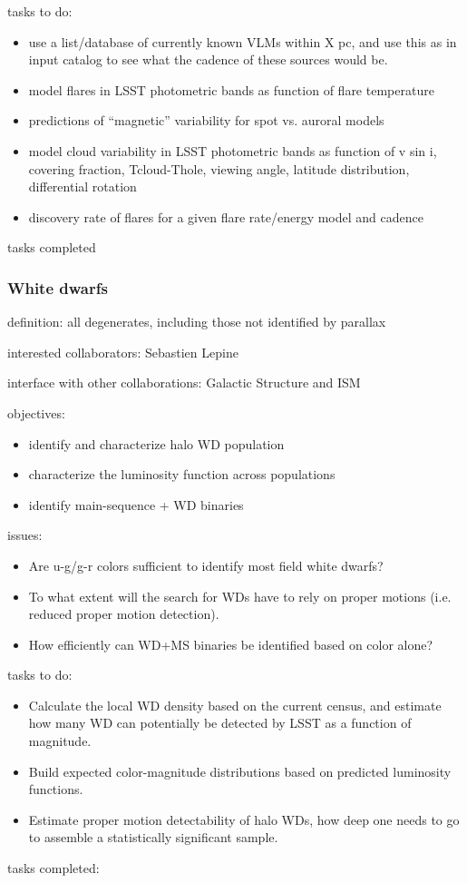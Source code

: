 tasks to do: 
\begin{itemize}
\item{ use 
a list/database of currently known VLMs within X pc, and use this as in input catalog 
to see what the cadence of these sources would be. }
\item{model 
flares in LSST photometric bands as function of flare temperature }
\item{predictions 
of “magnetic” variability for spot vs. auroral models }
\item{model 
cloud variability in LSST photometric bands as function of v sin i, covering 
fraction, Tcloud-Thole, viewing angle, latitude distribution, differential rotation }
\item{discovery 
rate of flares for a given flare rate/energy model and cadence }
\end{itemize}

tasks completed 


\subsubsection{White dwarfs}

definition: all degenerates, including those not identified by parallax  

interested collaborators: 
Sebastien Lepine 

interface with other collaborations: 
Galactic 
Structure and ISM  

objectives: 
\begin{itemize}
\item{identify and characterize halo WD population }
\item{characterize 
the luminosity function across populations }
\item{identify 
main-sequence + WD binaries }
\end{itemize}

issues: 
\begin{itemize}
\item{Are u-g/g-r colors sufficient to identify most field white dwarfs? }
\item{To 
what extent will the search for WDs have to rely on proper motions (i.e. reduced 
proper motion detection). }
\item{How 
efficiently can WD+MS binaries be identified based on color alone? }
\end{itemize}

tasks to do: 
\begin{itemize}
\item{Calculate the local WD density based on the current census, and estimate how many 
WD can potentially be detected by LSST as a function of magnitude. }
\item{Build 
expected color-magnitude distributions based on predicted luminosity functions. }
\item{Estimate 
proper motion detectability of halo WDs, how deep one needs to go to 
assemble a statistically significant sample.}
\end{itemize}

tasks completed: 



